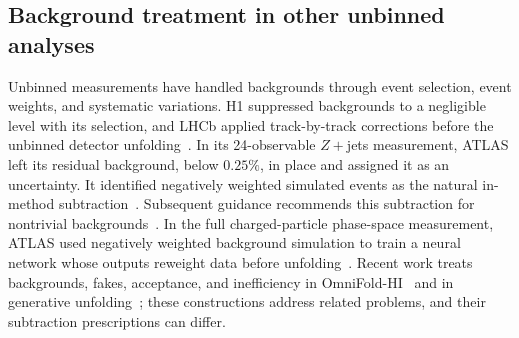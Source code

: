 \subsection{Background treatment in other unbinned analyses}
\label{sec:negweight-practice}

Unbinned measurements have handled backgrounds through event selection, event weights, and systematic variations. H1 suppressed backgrounds to a negligible level with its selection, and LHCb applied track-by-track corrections before the unbinned detector unfolding~\cite{H1:2021wkz,LHCb:2022rky}. In its 24-observable $Z+$jets measurement, ATLAS left its residual background, below $0.25\%$, in place and assigned it as an uncertainty. It identified negatively weighted simulated events as the natural in-method subtraction~\cite{ATLAS:2024jets}. Subsequent guidance recommends this subtraction for nontrivial backgrounds~\cite{Canelli:2025guide}. In the full charged-particle phase-space measurement, ATLAS used negatively weighted background simulation to train a neural network whose outputs reweight data before unfolding~\cite{ATLAS:2026fullps}. Recent work treats backgrounds, fakes, acceptance, and inefficiency in OmniFold-HI~\cite{Falcao:2025backgrounds} and in generative unfolding~\cite{Butter:2025genfold}; these constructions address related problems, and their subtraction prescriptions can differ.

